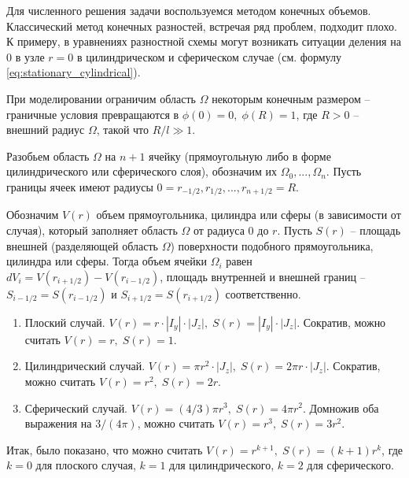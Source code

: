 Для численного решения задачи воспользуемся методом конечных объемов. Классический метод конечных разностей, встречая ряд проблем, подходит плохо. К примеру, в уравнениях разностной схемы могут возникать ситуации деления на 0 в узле $r = 0$ в цилиндрическом и сферическом случае (см. формулу \eqref{eq:stationary_cylindrical}).

При моделировании ограничим область $\Omega$ некоторым конечным размером -- граничные условия превращаются в $\phi(0) = 0, \; \phi(R) = 1$, где $R > 0$ -- внешний радиус $\Omega$, такой что $R / l \gg 1$.

Разобьем область $\Omega$ на $n + 1$ ячейку (прямоугольную либо в форме цилиндрического или сферического слоя), обозначим их $\Omega_0, ..., \Omega_n$. Пусть границы ячеек имеют радиусы $0 = r_{-1/2}, r_{1/2}, ..., r_{n + 1/2} = R$.

Обозначим $V(r)$ объем прямоугольника, цилиндра или сферы (в зависимости от случая), который заполняет область $\Omega$ от радиуса $0$ до $r$. Пусть $S(r)$ -- площадь внешней (разделяющей область $\Omega$) поверхности подобного прямоугольника, цилиндра или сферы. Тогда объем ячейки $\Omega_i$ равен $dV_i = V(r_{i + 1/2}) - V(r_{i - 1/2})$, площадь внутренней и внешней границ -- $S_{i - 1/2} = S(r_{i - 1/2})$ и $S_{i + 1/2} = S(r_{i + 1/2})$ соответственно.

\begin{enumerate}[label=\arabic*.]
    \item Плоский случай. $V(r) = r \cdot |I_y| \cdot |J_z|, \; S(r) = |I_y| \cdot |J_z|$. Сократив, можно считать $V(r) = r, \; S(r) = 1$.
    \item Цилиндрический случай. $V(r) = \pi r^2 \cdot |J_z|, \; S(r) = 2 \pi r \cdot |J_z|$. Сократив, можно считать $V(r) = r^2, \; S(r) = 2r$.
    \item Сферический случай. $V(r) = (4/3) \pi r^3, \; S(r) = 4 \pi r^2$. Домножив оба выражения на $3/(4\pi)$, можно считать $V(r) = r^3, \; S(r) = 3 r^2$.
\end{enumerate}

Итак, было показано, что можно считать $V(r) = r^{k + 1}, \; S(r) = (k + 1)r^k$, где $k = 0$ для плоского случая, $k = 1$ для цилиндрического, $k = 2$ для сферического.

